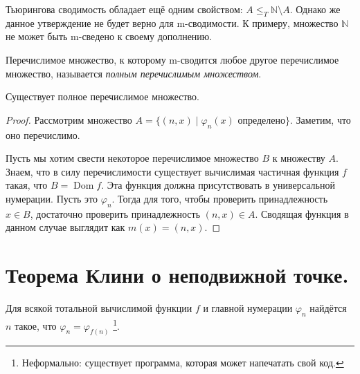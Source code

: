 \documentclass{article}
\begin{document}
    Тьюрингова сводимость обладает ещё одним свойством: $A \leqslant_T \mathbb{N} \setminus A$.
    Однако же данное утверждение не будет верно для m-сводимости. К примеру, множество $\mathbb{N}$
    не может быть m-сведено к своему дополнению.

    \begin{definition}
        Перечислимое множество, к которому m-сводится любое другое перечислимое множество, называется
        \textit{полным перечислимым множеством}.
    \end{definition}
    \begin{theorem}
        Существует полное перечислимое множество.
    \end{theorem}
    \begin{proof}
        Рассмотрим множество $A = \{(n, x) \mid \varphi_n(x) \text{ определено}\}$. Заметим, что оно
        перечислимо.

        Пусть мы хотим свести некоторое перечислимое множество $B$ к множеству $A$. Знаем, что
        в силу перечислимости существует вычислимая частичная функция $f$ такая, что $B
        = \operatorname{Dom} f$. Эта функция должна присутствовать в универсальной нумерации. Пусть
        это $\varphi_n$. Тогда для того, чтобы проверить принадлежность $x \in B$, достаточно проверить
        принадлежность $(n, x) \in A$. Сводящая функция в данном случае выглядит как $m(x) = (n,
        x)$.
    \end{proof}

    \section{Теорема Клини о неподвижной точке.}

    \begin{theorem}
        Для всякой тотальной вычислимой функции $f$ и главной нумерации $\varphi_n$ найдётся $n$
        такое, что $\varphi_n = \varphi_{f(n)}$ \footnote{Неформально: существует программа, которая
        может напечатать свой код.}.
    \end{theorem}
\end{document}
